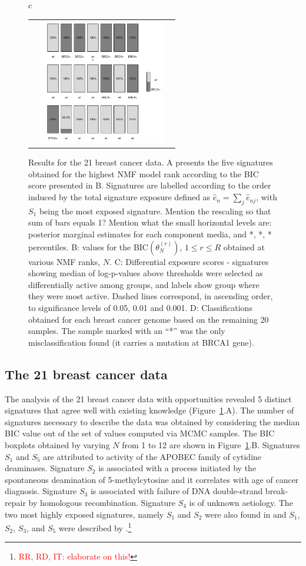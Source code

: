 \documentclass{bioinfo}
\begin{document}
\begin{figure}[t!]
\begin{tabular}{c}
\begin{tabular}{ccc}
     &
     \includegraphics[width=5.5cm]{figs/Classific_result_with_Opp_5b}
   \end{tabular}
 \end{tabular}
 \caption{\textrm{%
  Results for the 21 breast cancer data. A presents the five
  signatures obtained for the highest NMF model rank according to the
  BIC score presented in B. Signatures are labelled according to the
  order induced by the total signature exposure defined as $\hat e_n =
  \sum_{j} \hat e_{nj}$, with $S_1$ being the most exposed
  signature. Mention the rescaling so that sum of bars equals 1?
  Mention what the small horizontal levels are: posterior marginal
  estimates for each component media, and *, *, * percentiles. B: values
  for the BIC$(\theta^{(r)}_N)$, $1 \leq r \leq R$ obtained at various
  NMF ranks, $N$. C: Differential exposure scores - signatures showing 
  median of log-p-values above thresholds were selected as differentially 
  active among groups, and labels show group where they were most active. 
  Dashed lines correspond, in ascending order, to 
  significance levels of 0.05, 0.01 and 0.001. D: Classifications obtained 
  for each breast cancer genome based on the remaining 20 samples. The sample 
  marked with an ``*'' was the only misclassification found (it carries a 
  mutation at BRCA1 gene).
  }
 }\label{fig:bcancer} 
\end{figure}
\subsection{The 21 breast cancer data}
The analysis of the 21 breast cancer data with opportunities revealed
5 distinct signatures that agree well with existing knowledge
(Figure~\ref{fig:bcancer}.A).  The number of signatures necessary to
describe the data was obtained by considering the median BIC value out
of the set of values computed via MCMC samples. The BIC boxplots
obtained by varying $N$ from 1 to 12 are shown in
Figure~\ref{fig:bcancer}.B. Signatures $S_1$ and $S_5$ are attributed
to activity of the APOBEC family of cytidine deaminases. Signature
$S_2$ is associated with a process initiated by the spontaneous
deamination of 5-methylcytosine and it correlates with age of cancer
diagnosis. Signature $S_3$ is associated with failure of DNA
double-strand break-repair by homologous recombination.  Signature
$S_4$ is of unknown aetiology. The two most highly exposed signatures,
namely $S_1$ and $S_2$ were also found in \cite{FICMV} and $S_1$,
$S_2$, $S_3$, and $S_5$ were described by
\cite{A}.\footnote{\textcolor{red}{RR, RD, IT: elaborate on this!}}
\end{document}
